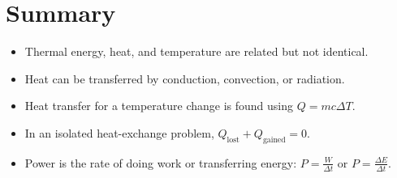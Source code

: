\section{Summary}
\begin{itemize}
    \item Thermal energy, heat, and temperature are related but not identical.
    \item Heat can be transferred by conduction, convection, or radiation.
    \item Heat transfer for a temperature change is found using $Q = mc\Delta T$.
    \item In an isolated heat-exchange problem, $Q_{\text{lost}} + Q_{\text{gained}} = 0$.
    \item Power is the rate of doing work or transferring energy: $P = \frac{W}{\Delta t}$ or $P = \frac{\Delta E}{\Delta t}$.
\end{itemize}


